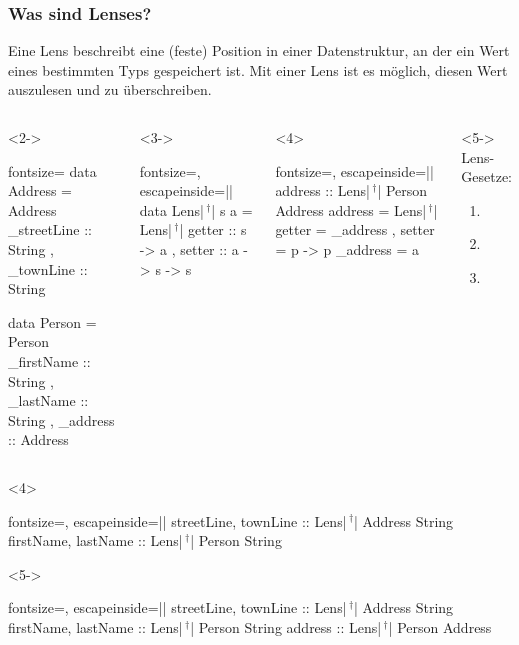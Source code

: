 \documentclass{beamer}
\newcommand{\kreuz}{$\,^\dag$} %
\begin{document}
\begin{frame}[t,fragile]
  \frametitle{Was sind Lenses?}
  Eine Lens beschreibt eine (feste) Position in einer Datenstruktur, an der ein Wert eines bestimmten Typs gespeichert ist.
  Mit einer Lens ist es möglich, diesen Wert auszulesen und zu überschreiben.
  \begin{columns}[t]
    \begin{visibleenv}<2->
\begin{haskellcode*}{fontsize=\small}
data Address = Address
  { _streetLine :: String
  , _townLine :: String
  }

data Person = Person
  { _firstName :: String
  , _lastName :: String
  , _address :: Address
  }
\end{haskellcode*}
    \end{visibleenv}
    \vspace{1em}
    \begin{visibleenv}<3->
\begin{haskellcode*}{fontsize=\small, escapeinside=||}
data Lens|\kreuz| s a = Lens|\kreuz|
  { getter :: s -> a
  , setter :: a -> s -> s
  }
\end{haskellcode*}
    \end{visibleenv}
    \begin{onlyenv}<4>
\begin{haskellcode*}{fontsize=\small, escapeinside=||}
address :: Lens|\kreuz| Person Address
address = Lens|\kreuz|
  { getter = _address
  , setter = \a p ->
      p { _address = a }
  }
\end{haskellcode*}
    \end{onlyenv}
    \begin{onlyenv}<5->
      Lens-Gesetze:
      \begin{enumerate}
        \small
        \item {}
        \item {} \\
        \item {}
      \end{enumerate}
    \end{onlyenv}
  \end{columns}
\begin{onlyenv}<4>
\begin{haskellcode*}{fontsize=\small, escapeinside=||}
 streetLine, townLine :: Lens|\kreuz| Address String
 firstName,  lastName :: Lens|\kreuz| Person String
\end{haskellcode*}
\end{onlyenv}
\begin{onlyenv}<5->
\begin{haskellcode*}{fontsize=\small, escapeinside=||}
 streetLine, townLine :: Lens|\kreuz| Address String
 firstName,  lastName :: Lens|\kreuz| Person String
 address              :: Lens|\kreuz| Person Address
\end{haskellcode*}
\end{onlyenv}
\end{frame}
\end{document}
